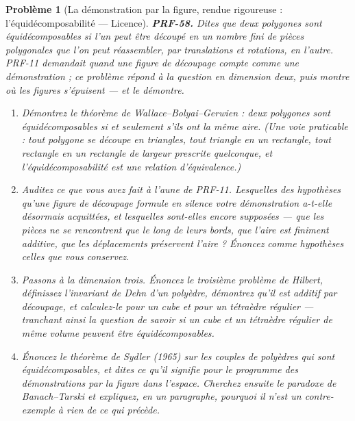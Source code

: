 \documentclass[11pt]{article}
\newtheorem{problem}{Problème}
\begin{document}
\begin{problem}[{La démonstration par la figure, rendue rigoureuse : l'équidécomposabilité --- Licence}]
\textbf{PRF-58.} Dites que deux polygones sont \textit{équidécomposables} si l'un peut
être découpé en un nombre fini de pièces polygonales que l'on peut réassembler, par
translations et rotations, en l'autre. PRF-11 demandait quand une figure de découpage compte
comme une démonstration ; ce problème répond à la question en dimension deux, puis montre où
les figures s'épuisent --- et le démontre.
\begin{enumerate}
\item[(a)] Démontrez le théorème de Wallace--Bolyai--Gerwien : deux polygones sont
équidécomposables si et seulement s'ils ont la même aire. (Une voie praticable : tout
polygone se découpe en triangles, tout triangle en un rectangle, tout rectangle en un
rectangle de largeur prescrite quelconque, et l'équidécomposabilité est une relation
d'équivalence.)
\item[(b)] Auditez ce que vous avez fait à l'aune de PRF-11. Lesquelles des hypothèses qu'une
figure de découpage formule en silence votre démonstration a-t-elle désormais acquittées, et
lesquelles sont-elles encore supposées --- que les pièces ne se rencontrent que le long de
leurs bords, que l'aire est finiment additive, que les déplacements préservent l'aire ?
Énoncez comme hypothèses celles que vous conservez.
\item[(c)] Passons à la dimension trois. Énoncez le troisième problème de Hilbert, définissez
l'invariant de Dehn d'un polyèdre, démontrez qu'il est additif par découpage, et calculez-le
pour un cube et pour un tétraèdre régulier --- tranchant ainsi la question de savoir si un
cube et un tétraèdre régulier de même volume peuvent être équidécomposables.
\item[(d)] Énoncez le théorème de Sydler (1965) sur les couples de polyèdres qui \textit{sont}
équidécomposables, et dites ce qu'il signifie pour le programme des démonstrations par la
figure dans l'espace. Cherchez ensuite le paradoxe de Banach--Tarski et expliquez, en un
paragraphe, pourquoi il n'est un contre-exemple à rien de ce qui précède.
\end{enumerate}

\end{problem}
\end{document}
